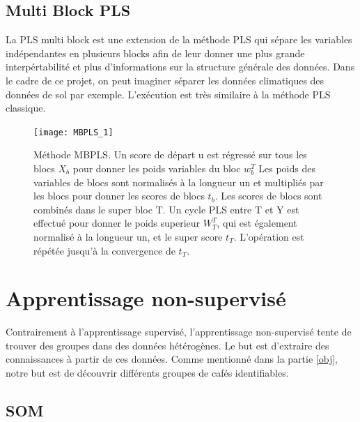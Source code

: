 \subsection{Multi Block PLS} 



La PLS multi block est une extension de la méthode PLS qui sépare les variables indépendantes en plusieurs blocks afin de leur donner une plus grande interpértabilité et plus d'informations sur la structure générale des données. Dans le cadre de ce projet, on peut imaginer séparer les données climatiques des données de sol par exemple.   
L'exécution est très similaire à la méthode PLS classique.  

\begin{figure}[H] 
	\centering
	\texttt{[image: MBPLS\_1]} 
	\caption{\label{MBPLSschema} Méthode MBPLS. Un score de départ u est régressé sur tous les blocs $ X_b $ pour donner les poids variables du bloc $ w^T_b $ Les poids des variables de blocs sont normalisés à la longueur un et multipliés par les blocs pour donner les scores de blocs $ t_b $.  Les scores de blocs sont combinés dans le super bloc T. Un cycle PLS entre T et Y est effectué pour donner le poids superieur $ W^T_T $, qui est également normalisé à la longueur un, et le super score $ t_T $. L'opération est répétée jusqu'à la convergence de $ t_T $. \cite{CEM:CEM515}} 
\end{figure} 






\newpage

\section{Apprentissage non-supervisé}
Contrairement à l'apprentissage supervisé, l'apprentissage non-supervisé tente de trouver des groupes dans des données hétérogènes. Le but est d'extraire des connaissances à partir de ces données. Comme mentionné dans la partie \ref{obj}, notre but est de découvrir différents groupes de cafés identifiables. 


\subsection{SOM}


